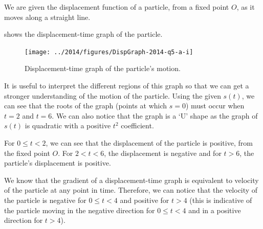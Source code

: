 %
%
%


\begin{subquestions}
	
\subquestion

We are given the displacement function of a particle, from a fixed point $O$, as it moves along a straight line.

\begin{subsubquestions}
	
\subsubquestion

 shows the displacement-time graph of the particle.
\begin{figure}[H]
	\begin{center}
		\texttt{[image: ../2014/figures/DispGraph-2014-q5-a-i]}
		\caption{\label{2014:q5:SGraph1} Displacement-time graph of the particle's motion.}
	\end{center}
\end{figure}

It is useful to interpret the different regions of this graph so that we can get a stronger understanding of the motion of the particle. Using the given $s(t)$, we can see that the roots of the graph (points at which $s=0$) must occur when $t=2$ and $t=6$. We can also notice that the graph is a `U' shape as the graph of $s(t)$ is quadratic with a positive $t^2$ coefficient. 

For $0 \leq t < 2$, we can see that the displacement of the particle is positive, from the fixed point $O$. For $2 < t < 6$, the displacement is negative and for $t>6$, the particle's displacement is positive.

We know that the gradient of a displacement-time graph is equivalent to velocity of the particle at any point in time. Therefore, we can notice that the velocity of the particle is negative for $0  \leq t < 4$ and positive for $t>4$ (this is indicative of the particle moving in the negative direction for $0 \leq t < 4$ and in a positive direction for $t>4$). 


\end{subsubquestions}
\end{subquestions}
